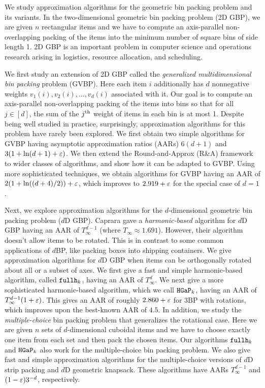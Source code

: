 We study approximation algorithms for
the geometric bin packing problem and its variants.
In the two-dimensional geometric bin packing problem (2D GBP),
we are given $n$ rectangular items and we have to compute
an axis-parallel non-overlapping packing
of the items into the minimum number of square bins of side length 1.
2D GBP is an important problem in computer science and operations research
arising in logistics, resource allocation, and scheduling.

We first study an extension of 2D GBP called the
\emph{generalized multidimensional bin packing} problem (GVBP).
Here each item $i$ additionally has $d$ nonnegative weights
$v_1(i), v_2(i), \ldots, v_d(i)$ associated with it.
Our goal is to compute an axis-parallel non-overlapping packing of the items into bins so that
for all $j \in [d]$, the sum of the $j^{\textrm{th}}$ weight of items in each bin is at most 1.
Despite being well studied in practice, surprisingly,
approximation algorithms for this problem have rarely been explored.
We first obtain two simple algorithms for GVBP having asymptotic approximation ratios (AARs)
$6(d+1)$ and $3(1 + \ln(d+1) + \varepsilon)$.
We then extend the Round-and-Approx (R\&A) framework
\texorpdfstring{\cite{bansal2014binpacking}}{[Bansal-Khan, SODA'14]}
to wider classes of algorithms, and show how it can be adapted to GVBP.
Using more sophisticated techniques, we obtain algorithms for GVBP having
an AAR of $2(1+\ln((d+4)/2))+\varepsilon$,
which improves to $2.919+\varepsilon$ for the special case of $d=1$.

Next, we explore approximation algorithms for the $d$-dimensional
geometric bin packing problem ($d$D GBP).
Caprara \cite{caprara2008} gave a \emph{harmonic-based} algorithm for $d$D GBP
having an AAR of $T_{\infty}^{d-1}$ (where $T_{\infty} \approx 1.691$).
However, their algorithm doesn't allow items to be rotated.
This is in contrast to some common applications of $d$BP,
like packing boxes into shipping containers.
We give approximation algorithms for $d$D GBP when items can be
orthogonally rotated about all or a subset of axes.
We first give a fast and simple harmonic-based algorithm,
called $\operatorname{\mathtt{fullh}}_k$, having an AAR of $T_{\infty}^{d}$.
We next give a more sophisticated harmonic-based algorithm,
which we call $\operatorname{\mathtt{HGaP}}_k$, having an AAR of $T_{\infty}^{d-1}(1+\varepsilon)$.
This gives an AAR of roughly $2.860 + \varepsilon$ for 3BP with rotations,
which improves upon the best-known AAR of $4.5$.
In addition, we study the \emph{multiple-choice} bin packing problem
that generalizes the rotational case.
Here we are given $n$ sets of $d$-dimensional cuboidal items and we have to
choose exactly one item from each set and then pack the chosen items.
Our algorithms $\operatorname{\mathtt{fullh}}_k$ and $\operatorname{\mathtt{HGaP}}_k$ also work for the multiple-choice bin packing problem.
We also give fast and simple approximation algorithms for the multiple-choice
versions of $d$D strip packing and $d$D geometric knapsack.
These algorithms have AARs $T_{\infty}^{d-1}$ and $(1-\varepsilon)3^{-d}$, respectively.

